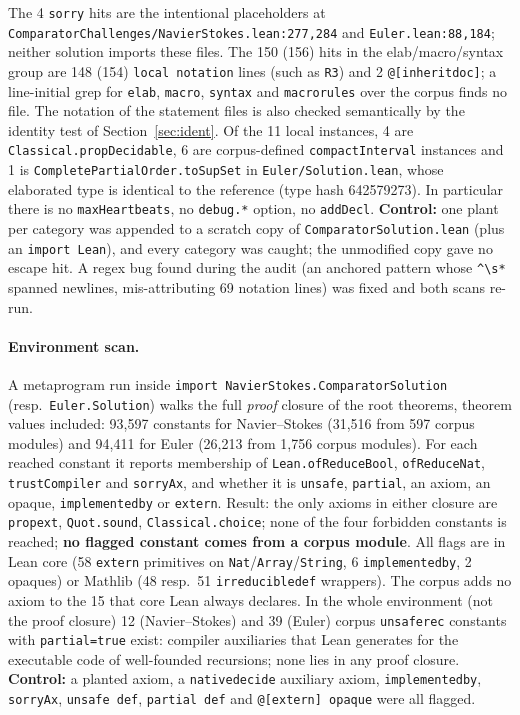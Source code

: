 \documentclass[10pt]{article}
\newcommand{\lean}[1]{\texttt{#1}}
\renewcommand{\_}{\textunderscore\allowbreak}
\begin{document}
The 4 \lean{sorry} hits are the intentional placeholders at \texttt{ComparatorChallenges/NavierStokes.lean:277,284} and \texttt{Euler.lean:88,184}; neither solution imports these files. The 150 (156) hits in the
elab/macro/syntax group are 148 (154) \lean{local notation} lines (such as \lean{R3}) and 2 \lean{@[inherit\_doc]}; a line-initial grep for \lean{elab}, \lean{macro}, \lean{syntax} and \lean{macro\_rules} over the corpus finds no file. The notation of the statement files is also
checked semantically by the identity test of Section~\ref{sec:ident}. Of the 11 local instances, 4 are \lean{Classical.propDecidable}, 6 are corpus-defined \lean{compactInterval} instances and 1 is \lean{CompletePartialOrder.toSupSet} in \texttt{Euler/Solution.lean}, whose elaborated type is identical to the reference (type hash 642579273). In particular there is
no \lean{maxHeartbeats}, no \lean{debug.*} option, no \lean{addDecl}.
\textbf{Control:} one plant per category was appended to a scratch copy of \texttt{ComparatorSolution.lean} (plus an \lean{import Lean}), and every category was caught; the unmodified copy gave no escape hit. A regex bug found during the audit (an anchored pattern whose \verb|^\s*| spanned newlines, mis-attributing 69 notation lines)
was fixed and both scans re-run.

\paragraph{Environment scan.} A metaprogram run inside \lean{import NavierStokes.ComparatorSolution} (resp.\ \lean{Euler.Solution}) walks the full \emph{proof} closure of the root theorems, theorem values included: 93,597 constants for Navier--Stokes (31,516 from 597 corpus modules) and 94,411 for Euler (26,213 from 1,756 corpus modules). For each reached
constant it reports membership of \lean{Lean.ofReduceBool}, \lean{ofReduceNat}, \lean{trustCompiler} and \lean{sorryAx}, and whether it is \lean{unsafe}, \lean{partial}, an axiom, an opaque, \lean{implemented\_by} or \lean{extern}. Result: the only axioms in either closure are \lean{propext}, \lean{Quot.sound}, \lean{Classical.choice};
none of the four forbidden constants is reached; \textbf{no flagged constant comes from a corpus module}. All flags are in Lean core (58 \lean{extern} primitives on \lean{Nat}/\lean{Array}/\lean{String}, 6 \lean{implemented\_by}, 2 opaques) or Mathlib (48 resp.\ 51 \lean{irreducible\_def} wrappers). The corpus adds no axiom to the 15 that core Lean always declares. In the whole environment (not the proof closure)
12 (Navier--Stokes) and 39 (Euler) corpus \lean{\_unsafe\_rec} constants with \lean{partial=true} exist: compiler auxiliaries that Lean generates for the executable code of well-founded recursions; none lies in any proof closure. \textbf{Control:} a planted axiom, a \lean{native\_decide} auxiliary axiom, \lean{implemented\_by},
\lean{sorryAx}, \lean{unsafe def}, \lean{partial def} and \lean{@[extern] opaque} were all flagged.
\end{document}
